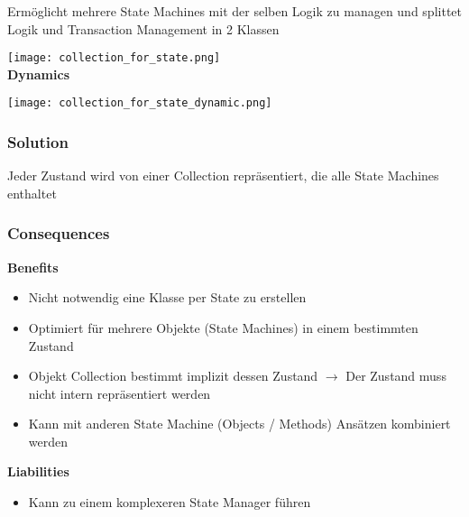Ermöglicht mehrere State Machines mit der selben Logik zu managen und splittet Logik und Transaction Management in 2 Klassen

\texttt{[image: collection\_for\_state.png]} \\

\textbf{Dynamics}

\texttt{[image: collection\_for\_state\_dynamic.png]}

\subsubsection{Solution}

Jeder Zustand wird von einer Collection repräsentiert, die alle State Machines enthaltet

\subsubsection{Consequences}
\textbf{Benefits}
\begin{itemize}
    \item Nicht notwendig eine Klasse per State zu erstellen
    \item Optimiert für mehrere Objekte (State Machines) in einem bestimmten Zustand
    \item Objekt Collection bestimmt implizit dessen Zustand $\rightarrow$ Der Zustand muss nicht intern repräsentiert werden
    \item Kann mit anderen State Machine (Objects / Methods) Ansätzen kombiniert werden
\end{itemize}
\vspace{10pt}
\textbf{Liabilities}
\begin{itemize}
    \item Kann zu einem komplexeren State Manager führen
\end{itemize}

